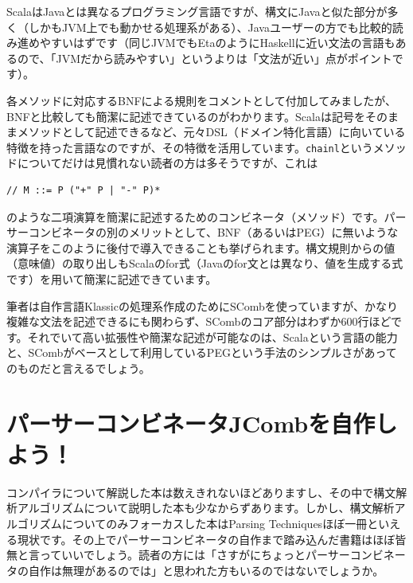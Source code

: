 ScalaはJavaとは異なるプログラミング言語ですが、構文にJavaと似た部分が多く（しかもJVM上でも動かせる処理系がある）、Javaユーザーの方でも比較的読み進めやすいはずです（同じJVMでもEtaのようにHaskellに近い文法の言語もあるので、「JVMだから読みやすい」というよりは「文法が近い」点がポイントです）。

各メソッドに対応するBNFによる規則をコメントとして付加してみましたが、BNFと比較しても簡潔に記述できているのがわかります。Scalaは記号をそのままメソッドとして記述できるなど、元々DSL（ドメイン特化言語）に向いている特徴を持った言語なのですが、その特徴を活用しています。\texttt{chainl}というメソッドについてだけは見慣れない読者の方は多そうですが、これは

\begin{verbatim}
// M ::= P ("+" P | "-" P)*
\end{verbatim}

のような二項演算を簡潔に記述するためのコンビネータ（メソッド）です。パーサーコンビネータの別のメリットとして、BNF（あるいはPEG）に無いような演算子をこのように後付で導入できることも挙げられます。構文規則からの値（意味値）の取り出しもScalaのfor式（Javaのfor文とは異なり、値を生成する式です）を用いて簡潔に記述できています。

筆者は自作言語Klassicの処理系作成のためにSCombを使っていますが、かなり複雑な文法を記述できるにも関わらず、SCombのコア部分はわずか600行ほどです。それでいて高い拡張性や簡潔な記述が可能なのは、Scalaという言語の能力と、SCombがベースとして利用しているPEGという手法のシンプルさがあってのものだと言えるでしょう。

\hypertarget{chapter6-ux30d1ux30fcux30b5ux30fcux30b3ux30f3ux30d3ux30cdux30fcux30bfjcombux3092ux81eaux4f5cux3057ux3088ux3046}{%
\section{パーサーコンビネータJCombを自作しよう！}\label{chapter6-ux30d1ux30fcux30b5ux30fcux30b3ux30f3ux30d3ux30cdux30fcux30bfjcombux3092ux81eaux4f5cux3057ux3088ux3046}}

コンパイラについて解説した本は数えきれないほどありますし、その中で構文解析アルゴリズムについて説明した本も少なからずあります。しかし、構文解析アルゴリズムについてのみフォーカスした本はParsing
Techniquesほぼ一冊といえる現状です。その上でパーサーコンビネータの自作まで踏み込んだ書籍はほぼ皆無と言っていいでしょう。読者の方には「さすがにちょっとパーサーコンビネータの自作は無理があるのでは」と思われた方もいるのではないでしょうか。

